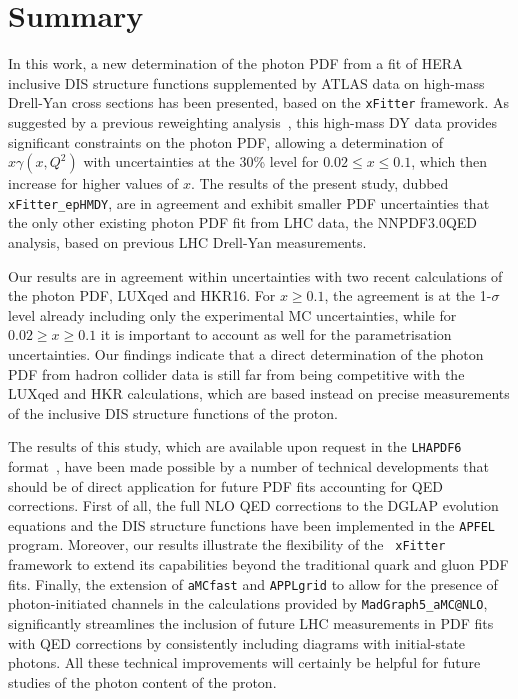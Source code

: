 \section{Summary}
\label{sec:conclusions}

In this work, a new determination of the photon PDF from
a fit of HERA inclusive DIS structure functions supplemented
by ATLAS data on high-mass Drell-Yan cross
sections has been presented, based on the {\tt xFitter} framework.
%
As suggested by a previous reweighting analysis~\cite{Aad:2016zzw}, this
high-mass DY data provides significant constraints on the photon PDF,
allowing a determination of $x\gamma(x, Q^2)$ with uncertainties at the
30\% level for $0.02 \le x \le 0.1$, which then increase for higher
values of $x$.
%
The results of the present study, dubbed {\tt xFitter\_epHMDY}, are in agreement
and exhibit smaller PDF uncertainties that the only
other existing photon PDF fit from LHC data, the 
NNPDF3.0QED analysis, based on previous LHC Drell-Yan measurements.

Our results are in agreement within uncertainties with two recent
calculations of the photon PDF, LUXqed and HKR16.
%
For $x\ge 0.1$, the agreement is at the 1-$\sigma$ level already including
only the experimental MC uncertainties, while for $0.02 \ge x \ge 0.1$ it is
important to account as well for the parametrisation uncertainties.
%
Our findings indicate that a direct determination of the
photon PDF from hadron collider data
is still far from being competitive with the LUXqed and HKR
calculations, which are based instead on precise measurements of the inclusive DIS
structure functions of the proton.
%

The results of this study, which
 are available upon
 request in the {\tt LHAPDF6} format~\cite{Buckley:2014ana},
 have been made possible by a number of
technical developments that should be of direct application for future
PDF fits accounting for QED corrections.
%
First of all, the full NLO
QED corrections to the DGLAP evolution equations and the DIS
structure functions have been implemented in the  {\tt APFEL} program.
%
Moreover, our results illustrate the flexibility of the {\tt
  xFitter} framework to extend its capabilities beyond the traditional
quark and gluon PDF fits.
%
Finally, the extension of {\tt aMCfast} and {\tt APPLgrid} to allow
for the presence of photon-initiated channels in the calculations
provided by {\tt MadGraph5\_aMC@NLO}, significantly streamlines the
inclusion of future LHC measurements in PDF fits with QED corrections by
consistently including diagrams with initial-state photons.
%
All these technical improvements will certainly be helpful for future
studies of the photon content of the proton.\\

